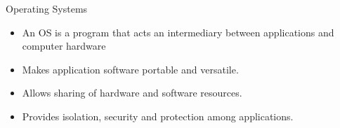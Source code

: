 \documentclass{beamer}
\begin{document}
\begin{frame}{Operating Systems}
  \begin{itemize}
  \item An OS is a program that acts an intermediary
    between applications and computer hardware
  \item Makes application software portable and versatile.
  \item Allows sharing of hardware and software resources.
  \item Provides isolation, security and protection among
    applications.
  \end{itemize}
  \begin{center}
  \end{center}
\end{frame}
\end{document}
